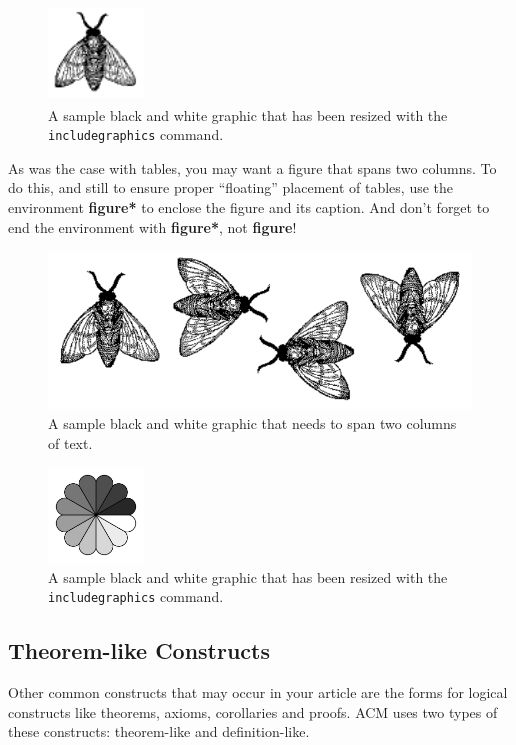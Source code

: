 \begin{figure}
\includegraphics[height=1in, width=1in]{fly}
\caption{A sample black and white graphic
that has been resized with the \texttt{includegraphics} command.}
\end{figure}


As was the case with tables, you may want a figure that spans two
columns.  To do this, and still to ensure proper ``floating''
placement of tables, use the environment \textbf{figure*} to enclose
the figure and its caption.  And don't forget to end the environment
with \textbf{figure*}, not \textbf{figure}!

\begin{figure}
\includegraphics{flies}
\caption{A sample black and white graphic
that needs to span two columns of text.}
\end{figure}


\begin{figure}
\includegraphics[height=1in, width=1in]{rosette}
\caption{A sample black and white graphic that has
been resized with the \texttt{includegraphics} command.}
\end{figure}

\subsection{Theorem-like Constructs}

Other common constructs that may occur in your article are the forms
for logical constructs like theorems, axioms, corollaries and proofs.
ACM uses two types of these constructs:  theorem-like and
definition-like.

